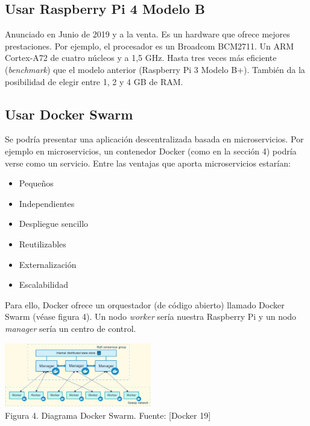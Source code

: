 \documentclass[9pt,oneside]{amsart}
\begin{document}
\begin{multicols}{2}
\subsection{Usar Raspberry Pi 4 Modelo B} \label{ch:rpi4modelb}
Anunciado en Junio de 2019 y a la venta. Es un hardware que ofrece mejores prestaciones. Por ejemplo, el procesador es un Broadcom BCM2711. Un ARM Cortex-A72 de cuatro núcleos y a 1,5 GHz. Hasta tres veces más eficiente (\textit{benchmark}) que el modelo anterior (Raspberry Pi 3 Modelo B+). También da la posibilidad de elegir entre 1, 2 y 4 GB de RAM.
\subsection{Usar Docker Swarm} \label{ch:dockerswarm}
Se podría presentar una aplicación descentralizada basada en microservicios. Por ejemplo en microservicios, un contenedor Docker (como en la sección 4) podría verse como un servicio. Entre las ventajas que aporta microservicios estarían:
\begin{itemize}
 \item Pequeños
 \item Independientes
 \item Despliegue sencillo
 \item Reutilizables
 \item Externalización
 \item Escalabilidad
 \newline
\end{itemize}
Para ello, Docker ofrece un orquestador (de código abierto) llamado Docker Swarm (véase figura 4). Un nodo \textit{worker} sería nuestra Raspberry Pi y un nodo \textit{manager} sería un centro de control.
\begin{center}
  \includegraphics[keepaspectratio, width=0.481125\textwidth]{images/swarm-diagram-sourcedocker.eps}
\\
Figura 4. Diagrama Docker Swarm. Fuente: [Docker 19]
\\
\end{center}

\end{multicols}
\end{document}
